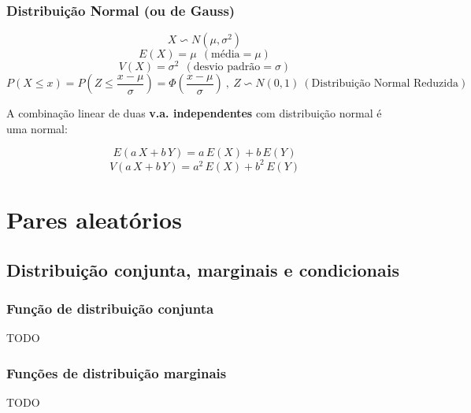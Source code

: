 \documentclass[11pt, a4paper]{article}
\begin{document}
\subsubsection*{Distribuição Normal (ou de Gauss)}

\begin{equation*}
    X \backsim N(\mu, \sigma^2)
\end{equation*}
\begin{equation*}
    E(X) = \mu \ \ (\text{média} = \mu)
\end{equation*}
\begin{equation*}
    V(X) = \sigma^2 \ \ (\text{desvio padrão} = \sigma)
\end{equation*}
\begin{equation*}
    P(X \leq x) = P\left(Z \leq \frac{x-\mu}{\sigma}\right) =
    \Phi\left(\frac{x-\mu}{\sigma}\right) \ , \
    Z \backsim N(0,1) \ (\text{Distribuição Normal Reduzida})
\end{equation*}

A combinação linear de duas \textbf{v.a. independentes} com distribuição normal é uma normal:

\begin{equation*}
    E(a\,X+b\,Y) = a\,E(X) + b\,E(Y)
\end{equation*}
\begin{equation*}
    V(a\,X+b\,Y) =  a^2\,E(X) + b^2\,E(Y)
\end{equation*}

\newpage
\section{Pares aleatórios}

\subsection{Distribuição conjunta, marginais e condicionais}

\subsubsection*{Função de distribuição conjunta}

TODO

\subsubsection*{Funções de distribuição marginais}

TODO
\end{document}
